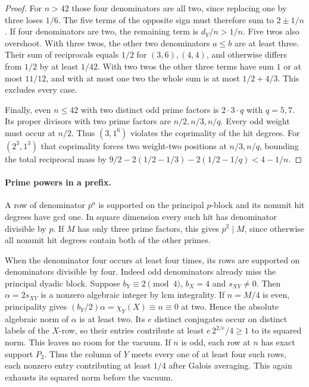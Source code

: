 \documentclass[11pt]{amsart}
\numberwithin{equation}{section}
\begin{document}
\begin{proof}
For $n>42$ those four denominators are all two, since replacing one by three loses $1/6$. The five terms of the opposite sign must therefore sum to $2\pm1/n$. If four denominators are two, the remaining term is $d_Y/n>1/n$. Five twos also overshoot. With three twos, the other two denominators $a\le b$ are at least three. Their sum of reciprocals equals $1/2$ for $(3,6),(4,4)$, and otherwise differs from $1/2$ by at least $1/42$. With two twos the other three terms have sum $1$ or at most $11/12$, and with at most one two the whole sum is at most $1/2+4/3$. This excludes every case.

Finally, even $n\le42$ with two distinct odd prime factors is $2\cdot3\cdot q$ with $q=5,7$. Its proper divisors with two prime factors are $n/2,n/3,n/q$. Every odd weight must occur at $n/2$. Thus $(3,1^6)$ violates the coprimality of the hit degrees. For $(2^3,1^3)$ that coprimality forces two weight-two positions at $n/3,n/q$, bounding the total reciprocal mass by $9/2-2(1/2-1/3)-2(1/2-1/q)<4-1/n$.
\end{proof}

\paragraph{Prime powers in a prefix.}
A row of denominator $p^a$ is supported on the principal $p$-block and its nonunit hit degrees have gcd one. In square dimension every such hit has denominator divisible by $p$. If $M$ has only three prime factors, this gives $p^2\mid M$, since otherwise all nonunit hit degrees contain both of the other primes.

When the denominator four occurs at least four times, its rows are supported on denominators divisible by four. Indeed odd denominators already miss the principal dyadic block. Suppose $b_Y\equiv2\pmod4$, $b_X=4$ and $s_{XY}\ne0$. Then $\alpha=2s_{XY}$ is a nonzero algebraic integer by lcm integrality. If $n=M/4$ is even, principality gives $(b_Y/2)\alpha=\chi_Y(X)\equiv n\equiv0$ at two. Hence the absolute algebraic norm of $\alpha$ is at least two. Its $e$ distinct conjugates occur on distinct labels of the $X$-row, so their entries contribute at least $e\,2^{2/e}/4\ge1$ to its squared norm. This leaves no room for the vacuum. If $n$ is odd, each row at $n$ has exact support $P_2$. Thus the column of $Y$ meets every one of at least four such rows, each nonzero entry contributing at least $1/4$ after Galois averaging. This again exhausts its squared norm before the vacuum.
\end{document}
